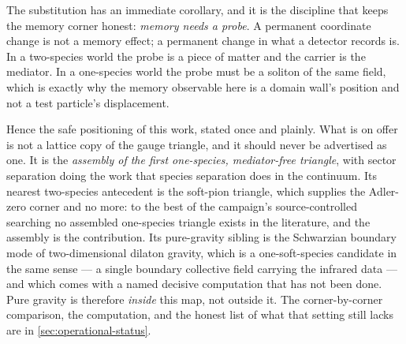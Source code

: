 The substitution has an immediate corollary, and it is the discipline that
keeps the memory corner honest: \emph{memory needs a probe}. A permanent
coordinate change is not a memory effect; a permanent change in what a detector
records is. In a two-species world the probe is a piece of matter and the
carrier is the mediator. In a one-species world the probe must be a soliton of
the same field, which is exactly why the memory observable here is a domain
wall's position and not a test particle's displacement.

Hence the safe positioning of this work, stated once and plainly. What is on
offer is not a lattice copy of the gauge triangle, and it should never be
advertised as one. It is the \emph{assembly of the first one-species,
mediator-free triangle}, with sector separation doing the work that species
separation does in the continuum. Its nearest two-species antecedent is the
soft-pion triangle, which supplies the Adler-zero corner and no more: to the
best of the campaign's source-controlled searching no assembled one-species
triangle exists in the literature, and the assembly is the contribution. Its
pure-gravity sibling is the Schwarzian boundary mode of two-dimensional dilaton
gravity, which is a one-soft-species candidate in the same sense --- a single
boundary collective field carrying the infrared data --- and which comes with a
named decisive computation that has not been done. Pure gravity is therefore
\emph{inside} this map, not outside it. The corner-by-corner comparison, the
computation, and the honest list of what that setting still lacks are in
\cref{sec:operational-status}.

